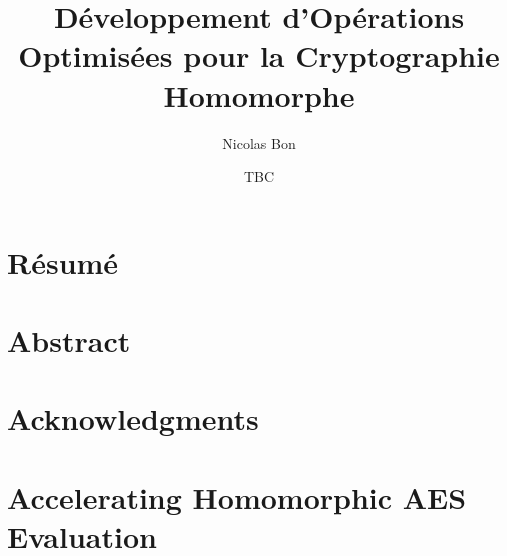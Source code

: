 \documentclass[11pt, twoside, openright]{thesis}
\title{Développement d'Opérations Optimisées pour la Cryptographie Homomorphe}
\institute{l’École Normale Supérieure de Paris}
\author{Nicolas Bon}
\date{TBC}
\begin{document}
\frontmatter 
\hypersetup{pageanchor=false}
\maketitle
\hypersetup{pageanchor=true}
\dominitoc



\cleardoublepage
\chapter*{Résumé}
\thefrabstract{}
\vfill
\thefrkeywords{}
\cleardoublepage
\chapter*{Abstract}
\theenabstract{}
\vfill
\theenkeywords{}

\cleardoublepage
\chapter*{Acknowledgments}

\cleardoublepage
\hypertarget{contents}{}
\tableofcontents


\mainmatter























\chapter{Accelerating Homomorphic AES Evaluation}
\label{chap:hyppogriph}

\end{document}
